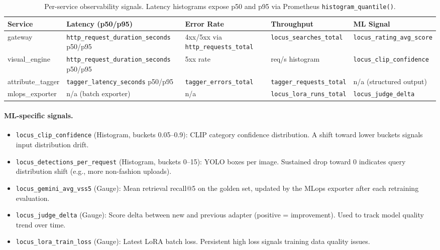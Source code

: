 \documentclass[12pt]{article}
\begin{document}
\begin{table}[H]
\centering
\small
\begin{tabular}{@{}lllll@{}}
\toprule
\textbf{Service} & \textbf{Latency (p50/p95)} & \textbf{Error Rate} & \textbf{Throughput} & \textbf{ML Signal} \\ \midrule
gateway          & \texttt{http\_request\_duration\_seconds} p50/p95 & 4xx/5xx via \texttt{http\_requests\_total} & \texttt{locus\_searches\_total} & \texttt{locus\_rating\_avg\_score} \\
visual\_engine   & \texttt{http\_request\_duration\_seconds} p50/p95 & 5xx rate             & req/s histogram              & \texttt{locus\_clip\_confidence} \\
attribute\_tagger& \texttt{tagger\_latency\_seconds} p50/p95        & \texttt{tagger\_errors\_total} & \texttt{tagger\_requests\_total} & n/a (structured output) \\
mlops\_exporter  & n/a (batch exporter)                             & n/a                  & \texttt{locus\_lora\_runs\_total}& \texttt{locus\_judge\_delta} \\ \bottomrule
\end{tabular}
\caption{Per-service observability signals. Latency histograms expose p50 and p95 via Prometheus \texttt{histogram\_quantile()}.}
\label{tab:per-service-metrics}
\end{table}

\paragraph{ML-specific signals.}
\begin{itemize}[leftmargin=*, itemsep=2pt]
  \item \texttt{locus\_clip\_confidence} (Histogram, buckets 0.05--0.9): CLIP category confidence distribution. A shift toward lower buckets signals input distribution drift.
  \item \texttt{locus\_detections\_per\_request} (Histogram, buckets 0--15): YOLO boxes per image. Sustained drop toward 0 indicates query distribution shift (e.g., more non-fashion uploads).
  \item \texttt{locus\_gemini\_avg\_vss5} (Gauge): Mean retrieval recall@5 on the golden set, updated by the MLops exporter after each retraining evaluation.
  \item \texttt{locus\_judge\_delta} (Gauge): Score delta between new and previous adapter (positive = improvement). Used to track model quality trend over time.
  \item \texttt{locus\_lora\_train\_loss} (Gauge): Latest LoRA batch loss. Persistent high loss signals training data quality issues.
\end{itemize}
\end{document}
